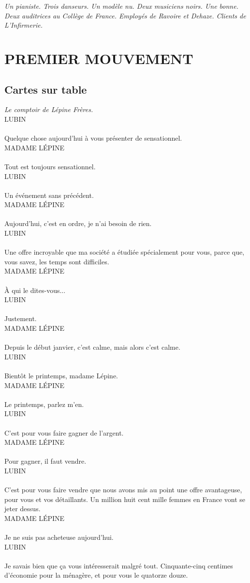 \documentclass[a4paper]{report}
\newcommand{\repl}[2]{\uppercase{#1}\\\\#2\\}
\newcommand{\didas}[1]{\textit{#1}\\}
\begin{document}
\begin{center}
\textit{Un pianiste. Trois danseurs. Un modèle nu. Deux musiciens noirs. Une bonne. Deux auditrices au Collège de France. Employés de Ravoire et Dehaze. Clients de L'Infirmerie.}
\end{center}

\chapter*{PREMIER MOUVEMENT\\}

\section*{Cartes sur table}

\setlength{\parindent}{0em}

\didas{Le comptoir de Lépine Frères.}

\repl{Lubin}{Quelque chose aujourd'hui à vous présenter de sensationnel.}

\repl{Madame Lépine}{Tout est toujours sensationnel.}

\repl{Lubin}{Un événement sans précédent.}

\repl{Madame Lépine}{Aujourd'hui, c'est en ordre, je n'ai besoin de rien.}

\repl{Lubin}{Une offre incroyable que ma société a étudiée spécialement pour vous, parce que, vous savez, les temps sont difficiles.}

\repl{Madame Lépine}{À qui le dites-vous...}

\repl{Lubin}{Justement.}

\repl{Madame Lépine}{Depuis le début janvier, c'est calme, mais alors c'est calme.}

\repl{Lubin}{Bientôt le printemps, madame Lépine.}

\repl{Madame Lépine}{Le printemps, parlez m'en.}

\repl{Lubin}{C'est pour vous faire gagner de l'argent.}

\repl{Madame Lépine}{Pour gagner, il faut vendre.}

\repl{Lubin}{C'est pour vous faire vendre que nous avons mis au point une offre avantageuse, pour vous et vos détaillants. Un million huit cent mille femmes en France vont se jeter dessus.}

\repl{Madame Lépine}{Je ne suis pas acheteuse aujourd'hui.}

\repl{Lubin}{Je savais bien que ça vous intéresserait malgré tout. Cinquante-cinq centimes d'économie pour la ménagère, et pour vous le quatorze douze.}
\end{document}
